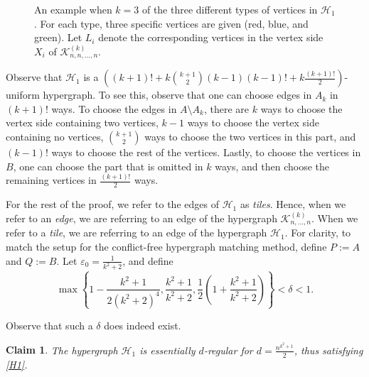 \documentclass{article}
\newtheorem{claim}[theorem]{Claim}
\theoremstyle{definition}
\newcommand\cH{{\mathcal H}}
\newcommand\cK{{\mathcal K}}
\begin{document}
\begin{figure}[h!]
    \centering
    
    \caption{An example when $k=3$ of the three different types of vertices in $\mathcal{H}_1$. For each type, three specific vertices are given (red, blue, and green). Let $L_i$ denote the corresponding vertices in the vertex side $X_i$ of $\cK_{n,n,...,n}^{(k)}$.}
    \label{fig: ex-tile-thm2}
\end{figure}

Observe that $\cH_1$ is a $\left( (k+1)! + k \binom{k+1}{2} (k-1)(k-1)! + k\frac{(k+1)!}{2} \right)$-uniform hypergraph. To see this, observe that one can choose edges in $A_k$ in $(k+1)!$ ways. To choose the edges in $A \setminus A_{k}$, there are $k$ ways to choose the vertex side containing two vertices, $k-1$ ways to choose the vertex side containing no vertices, $\binom{k+1}{2}$ ways to choose the two vertices in this part, and $(k-1)!$ ways to choose the rest of the vertices. Lastly, to choose the vertices in $B$, one can choose the part that is omitted in $k$ ways, and then choose the remaining vertices in $\frac{(k+1)!}{2}$ ways. 

For the rest of the proof, we refer to the edges of $\cH_1$ as \emph{tiles}.  Hence, when we refer to an \emph{edge}, we are referring to an edge of the hypergraph $\cK_{n, \dots, n}^{(k)}$.  When we refer to a \emph{tile}, we are referring to an edge of the hypergraph $\cH_1$.  For clarity, to match the setup for the conflict-free hypergraph matching method, define $P := A$ and $Q := B$.  Let $\varepsilon_0 = \frac{1}{k^2+2}$, and define 
$$
    \max \left\{ 1 - \frac{k^2 + 1}{2(k^2 + 2)^4}, \frac{k^2 + 1}{k^2 + 2} , \frac{1}{2} \left(1 + \frac{k^2+1}{k^2+2}\right) \right\} < \delta  < 1.
$$

Observe that such a $\delta$ does indeed exist.  



\begin{claim}
The hypergraph $\cH_1$ is essentially $d$-regular for $d = \frac{n^{k^2+1}}{2}$, thus satisfying \ref{H1}.
\end{claim}
\end{document}
